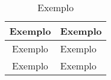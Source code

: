 \begin{table}[H]
\centering
\begin{tabular}{|c|p{10cm}|}
\hline
\textbf{Exemplo}      & \textbf{Exemplo}                                                                                       \\ \hline
Exemplo     & Exemplo \\ \hline
Exemplo     & Exemplo \\ \hline
\end{tabular}
\caption{Exemplo}
\label{table:example}
\end{table}